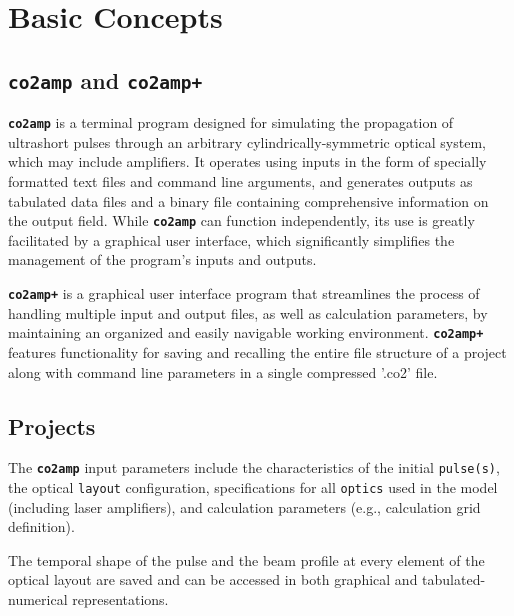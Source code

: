\documentclass{report}
\begin{document}
\chapter{Basic Concepts}

\section{\textbf{\texttt{co2amp}} and \textbf{\texttt{co2amp+}}}
\textbf{\texttt{co2amp}} is a terminal program designed for simulating the propagation of ultrashort pulses through an arbitrary cylindrically-symmetric optical system, which may include  amplifiers. It operates using inputs in the form of specially formatted text files and command line arguments, and generates outputs as tabulated data files and a binary file containing comprehensive information on the output field. While \textbf{\texttt{co2amp}} can function independently, its use is greatly facilitated by a graphical user interface, which significantly simplifies the management of the program’s inputs and outputs.

\textbf{\texttt{co2amp+}} is a graphical user interface program that streamlines the process of handling multiple input and output files, as well as calculation parameters, by maintaining an organized and easily navigable working environment. \textbf{\texttt{co2amp+}} features functionality for saving and recalling the entire file structure of a project along with command line parameters in a single compressed '.co2' file.


\section{Projects}
The \textbf{\texttt{co2amp}} input parameters include the characteristics of the initial \texttt{pulse(s)}, the optical \texttt{layout} configuration, specifications for all \texttt{optics} used in the model (including laser amplifiers), and calculation parameters (e.g., calculation grid definition).

The temporal shape of the pulse and the beam profile at every element of the optical layout are saved and can be accessed in both graphical and tabulated-numerical representations.
\end{document}

